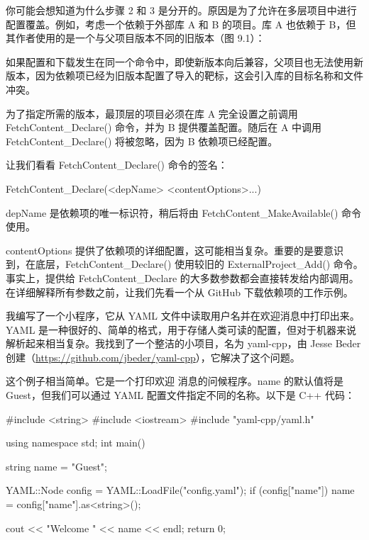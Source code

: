 你可能会想知道为什么步骤 2 和 3 是分开的。原因是为了允许在多层项目中进行配置覆盖。例如，考虑一个依赖于外部库 A 和 B 的项目。库 A 也依赖于 B，但其作者使用的是一个与父项目版本不同的旧版本（图 9.1）：


如果配置和下载发生在同一个命令中，即使新版本向后兼容，父项目也无法使用新版本，因为依赖项已经为旧版本配置了导入的靶标，这会引入库的目标名称和文件冲突。

为了指定所需的版本，最顶层的项目必须在库 A 完全设置之前调用 FetchContent\_Declare() 命令，并为 B 提供覆盖配置。随后在 A 中调用 FetchContent\_Declare() 将被忽略，因为 B 依赖项已经配置。

让我们看看 FetchContent\_Declare() 命令的签名：

\begin{shell}
FetchContent_Declare(<depName> <contentOptions>...)
\end{shell}

depName 是依赖项的唯一标识符，稍后将由 FetchContent\_MakeAvailable() 命令使用。

contentOptions 提供了依赖项的详细配置，这可能相当复杂。重要的是要意识到，在底层，FetchContent\_Declare() 使用较旧的 ExternalProject\_Add() 命令。事实上，提供给 FetchContent\_Declare 的大多数参数都会直接转发给内部调用。在详细解释所有参数之前，让我们先看一个从 GitHub 下载依赖项的工作示例。


我编写了一个小程序，它从 YAML 文件中读取用户名并在欢迎消息中打印出来。YAML 是一种很好的、简单的格式，用于存储人类可读的配置，但对于机器来说解析起来相当复杂。我找到了一个整洁的小项目，名为 yaml-cpp，由 Jesse Beder 创建（\url{https://github.com/jbeder/yaml-cpp}），它解决了这个问题。

这个例子相当简单。它是一个打印欢迎 消息的问候程序。name 的默认值将是 Guest，但我们可以通过 YAML 配置文件指定不同的名称。以下是 C++ 代码：


\begin{cpp}
#include <string>
#include <iostream>
#include "yaml-cpp/yaml.h"

using namespace std;
int main() {
    string name = "Guest";

    YAML::Node config = YAML::LoadFile("config.yaml");
    if (config["name"])
        name = config["name"].as<string>();

    cout << "Welcome " << name << endl;
    return 0;
}
\end{cpp}

